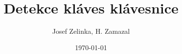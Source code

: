 \documentclass[aspectratio=169]{beamer}
\author[H. Zamazal, J. Zelinka]{Josef Zelinka, H. Zamazal}
\title{Detekce kláves klávesnice}
\date{\today}
\begin{document}
\begin{frame}
\titlepage
\end{frame}


\end{document}
